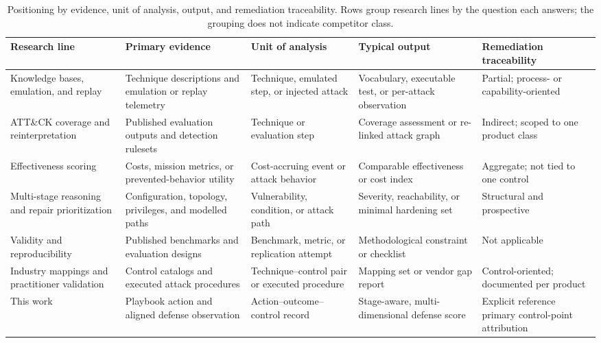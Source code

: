 \begin{table}[!t]
\centering
\small
\caption{Positioning by evidence, unit of analysis, output, and remediation traceability. Rows group research lines by the question each answers; the grouping does not indicate competitor class.}
\label{tab:related-work-position}
\setlength{\tabcolsep}{3pt}
\begin{tabular}{@{}p{}p{}p{}p{}p{}@{}}
\hline
\textbf{Research line} & \textbf{Primary evidence} & \textbf{Unit of analysis} & \textbf{Typical output} & \textbf{Remediation traceability} \\
\hline
Knowledge bases, emulation, and replay & Technique descriptions and emulation or replay telemetry & Technique, emulated step, or injected attack & Vocabulary, executable test, or per-attack observation & Partial; process- or capability-oriented \\
ATT\&CK coverage and reinterpretation & Published evaluation outputs and detection rulesets & Technique or evaluation step & Coverage assessment or re-linked attack graph & Indirect; scoped to one product class \\
Effectiveness scoring & Costs, mission metrics, or prevented-behavior utility & Cost-accruing event or attack behavior & Comparable effectiveness or cost index & Aggregate; not tied to one control \\
Multi-stage reasoning and repair prioritization & Configuration, topology, privileges, and modelled paths & Vulnerability, condition, or attack path & Severity, reachability, or minimal hardening set & Structural and prospective \\
Validity and reproducibility & Published benchmarks and evaluation designs & Benchmark, metric, or replication attempt & Methodological constraint or checklist & Not applicable \\
Industry mappings and practitioner validation & Control catalogs and executed attack procedures & Technique--control pair or executed procedure & Mapping set or vendor gap report & Control-oriented; documented per product \\
This work & Playbook action and aligned defense observation & Action--outcome--control record & Stage-aware, multi-dimensional defense score & Explicit reference primary control-point attribution \\
\hline
\end{tabular}
\end{table}

